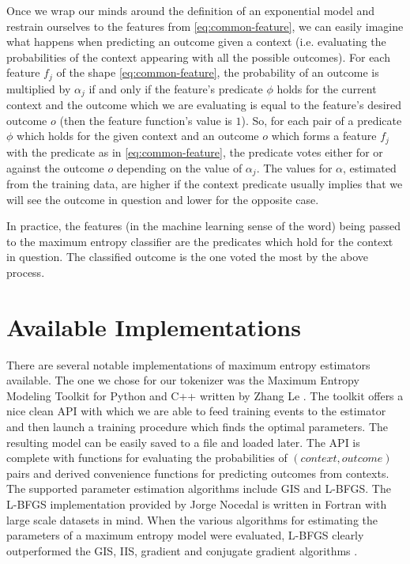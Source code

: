 Once we wrap our minds around the definition of an exponential model and
restrain ourselves to the features from \ref{eq:common-feature}, we can easily
imagine what happens when predicting an outcome given a context (i.e.
evaluating the probabilities of the context appearing with all the possible
outcomes). For each feature $f_j$ of the shape \ref{eq:common-feature}, the
probability of an outcome is multiplied by $\alpha_j$ if and only if the
feature's predicate $\phi$ holds for the current context and the outcome which
we are evaluating is equal to the feature's desired outcome $o$ (then the
feature function's value is $1$). So, for each pair of a predicate $\phi$ which
holds for the given context and an outcome $o$ which forms a feature $f_j$ with
the predicate as in \ref{eq:common-feature}, the predicate votes either for or
against the outcome $o$ depending on the value of $\alpha_j$. The values for
$\alpha$, estimated from the training data, are higher if the context predicate
usually implies that we will see the outcome in question and lower for the
opposite case.

In practice, the features (in the machine learning sense of the word) being
passed to the maximum entropy classifier are the predicates which hold for the
context in question. The classified outcome is the one voted the most by the
above process.

\section{Available Implementations}
\label{sec:maxent-impl}

There are several notable implementations of maximum entropy estimators
available. The one we chose for our tokenizer was the Maximum Entropy Modeling
Toolkit for Python and C++ written by Zhang Le \cite{maxent-toolkit}. The
toolkit offers a nice clean API with which we are able to feed training events
to the estimator and then launch a training procedure which finds the optimal
parameters. The resulting model can be easily saved to a file and loaded later.
The API is complete with functions for evaluating the probabilities of
$(context, outcome)$ pairs and derived convenience functions for predicting
outcomes from contexts. The supported parameter estimation algorithms include
GIS and L-BFGS. The L-BFGS implementation provided by Jorge Nocedal is written
in Fortran with large scale datasets in mind. When the various algorithms for
estimating the parameters of a maximum entropy model were evaluated, L-BFGS
clearly outperformed the GIS, IIS, gradient and conjugate gradient algorithms
\cite{maxent-algorithms}.


